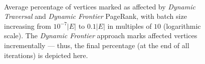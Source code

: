 \begin{figure}[!hbt]
  \centering
   \\[-2ex]
\caption{Average percentage of vertices marked as affected by \textit{Dynamic Traversal} and \textit{Dynamic Frontier} PageRank, with batch size increasing from $10^{-7} |E|$ to $0.1 |E|$ in multiples of $10$ (logarithmic scale). The \textit{Dynamic Frontier} approach marks affected vertices incrementally --- thus, the final percentage (at the end of all iterations) is depicted here.}
  \label{fig:measure-affected}
\end{figure}
